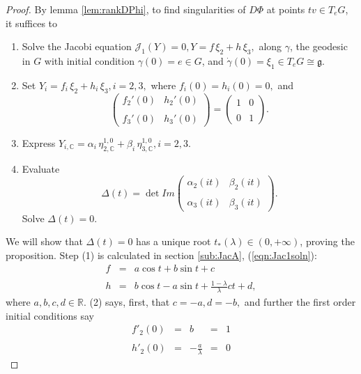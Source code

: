 \documentclass[12pt,reqno]{amsart}\usepackage{amssymb,amsmath,amscd,epsfig,amsthm,enumerate,import,eufrak}
\theoremstyle{definition}
\theoremstyle{remark}
\numberwithin{equation}{section}
\theoremstyle{plain}
\theoremstyle{definition}
\def \r {\mathbb{R}}
\def \c {\mathbb{C}}
\def \f {\mathcal{F}}
\def \h {\mathbb{H}}
\def \mfg {\mathfrak{g}}
\def \vs {\vskip 2mm}
\theoremstyle{remark}
\numberwithin{theorem}{section}
\begin{document}
\begin{proof}
	By lemma \ref{lem:rankDPhi}, to find singularities of $D\Phi$ at points $t v \in T_eG$, it suffices to \vs
	\begin{enumerate}
		\item Solve the Jacobi equation $\mathcal{J}_1(Y) = 0, Y = f \,\xi_2 + h\, \xi_3,$ along $\gamma$, the geodesic in $G$ with initial condition $\gamma(0) = e \in G$, and $\dot{\gamma}(0) = \xi_1 \in T_eG \cong \mfg$.\vs\vs
		\item Set $Y_i = f_i\, \xi_2 + h_i \, \xi_3, i =2, 3,$ where $f_i(0) = h_i(0) = 0,$ and \vs 
			\begin{equation}\label{eqn:Yinit}
				\left(\begin{array}{cc} f_2'(0)& h_2'(0) \\& \\f_3'(0) & h_3'(0) \end{array}\right) = \left(\begin{array}{cc} 1 & 0 \\& \\ 0 & 1\end{array}\right).
			\end{equation}\vs\vs
		\item Express $Y_{i,\c} = \alpha_i\, \eta_{2,\c}^{1,0} + \beta_i \, \eta_{3,\c}^{1,0}, i = 2,3.$\vs\vs
		\item Evaluate \[\Delta(t) = \det Im \left(\begin{array}{cc} \alpha_2(i t) & \beta_2(i t) \\ & \\ \alpha_3(i t) & \beta_3(i t) \end{array} \right).\] Solve $\Delta(t) = 0$.
	\end{enumerate}\vs\vs
%
We will show that $\Delta(t) = 0$ has a unique root $t_*(\lambda) \in (0, +\infty)$, proving the proposition.
%
\vs\vs
%
Step (1) is calculated in section \ref{sub:JacA}, (\ref{eqn:Jac1soln}):
	\[
	\begin{array}{rcl}
		f & = & a \cos t + b \sin t + c\\&&\\h & = &  b \cos t - a \sin t + \frac{1-\lambda}{\lambda} c t + d, 
	\end{array}
	\]
%
where $a, b, c ,d \in \r$. (2) says, first, that $c = - a, d = - b,$ and further the first order initial conditions say
%
\vs
%
\[
\begin{array}{rcccl} f'_2(0) & = & b & =& 1 \\&&&&\\h'_2(0) & =& - \frac{a}{\lambda} & = & 0\end{array}
\]
\end{proof}
\end{document}
